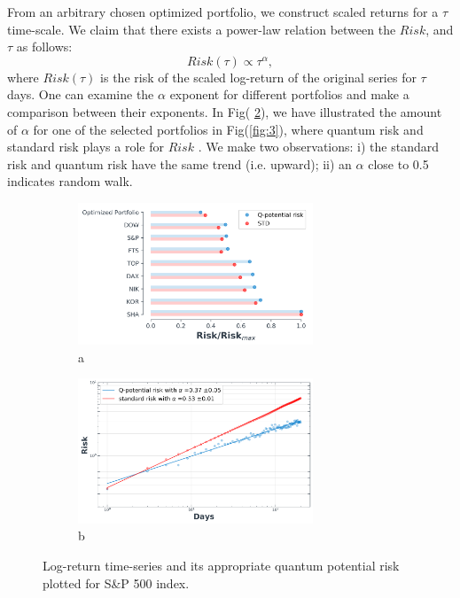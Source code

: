 \documentclass[ aip,jmp,reprint]{revtex4-2}
\begin{document}
From an arbitrary chosen optimized portfolio, we construct scaled returns
for a $\tau $ time-scale. We claim that there exists a power-law relation
between the $Risk$, and $\tau $ as follows: 
\begin{equation}
Risk(\tau )\propto \tau ^{\alpha },
\end{equation}%
where $Risk(\tau )$ is the risk of the scaled log-return of the original
series for $\tau $ days. One can examine the $\alpha $ exponent for
different portfolios and make a comparison between their exponents. In Fig(%
\ref{fig3:sub2}), we have illustrated the amount of $\alpha $ for one of the
selected portfolios in Fig(\ref{fig:3}), where quantum risk and standard
risk plays a role for $Risk$ . We make two observations: i) the standard
risk and quantum risk have the same trend (i.e. upward); ii) an $\alpha $
close to 0.5 indicates random walk.  
\begin{figure}[tbh]
\begin{subfigure}{0.49\textwidth}
		\centering
		\includegraphics[width=70mm]{fig1.png}
		\caption{a}
		\label{fig3:sub1}
	\end{subfigure}
\begin{subfigure}{0.49\textwidth}
		\centering
		\includegraphics[width=70mm]{fig3_a.png}
		\caption{b}
		\label{fig3:sub2}
	\end{subfigure}
\caption{Log-return time-series and its appropriate quantum potential risk
plotted for S\&P 500 index.}
\label{fig:4}
\end{figure}
\end{document}
